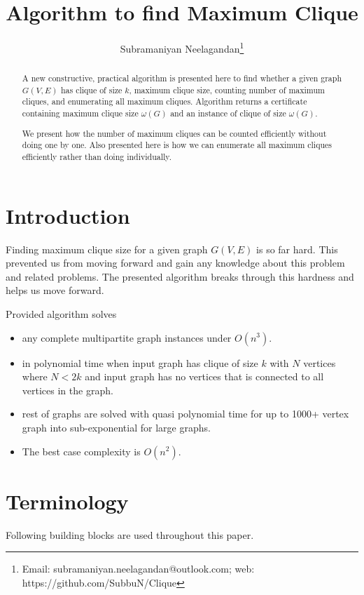 \documentclass[12pt]{article}
\theoremstyle{plain}
\theoremstyle{definition}
\begin{document}
	\title{Algorithm to find Maximum Clique}
	\author[1]{Subramaniyan Neelagandan\footnote{Email: subramaniyan.neelagandan@outlook.com; web: https://github.com/SubbuN/Clique}}
	
	\date{}
	\maketitle

\begin{abstract}
	A new constructive, practical algorithm is presented here to find whether a given graph $G(V,E)$ has clique of size $k$, maximum clique size, counting number of maximum cliques, and enumerating all maximum cliques. Algorithm returns a certificate containing maximum clique size $\omega(G)$ and an instance of clique of size $\omega(G)$.
	
	We present how the number of maximum cliques can be counted efficiently without doing one by one. Also presented here is how we can enumerate all maximum cliques efficiently rather than doing individually.
\end{abstract}


\section{Introduction}
Finding maximum clique size for a given graph $G(V,E)$ is so far hard. This prevented us from moving forward and gain any knowledge about this problem and related problems. The presented algorithm breaks through this hardness and helps us move forward.

Provided algorithm solves 
\begin{itemize}
	\setlength{\itemsep}{0pt}
	\setlength{\parskip}{0pt}
	\setlength{\parsep}{0pt}
	\item any complete multipartite graph instances under $O(n^3)$.
	\item in polynomial time when input graph has clique of size $k$ with $N$ vertices where $N < 2k$ and input graph has no vertices that is connected to all vertices in the graph.
	\item rest of graphs are solved with quasi polynomial time for up to 1000+ vertex graph into sub-exponential for large graphs.
	\item The best case complexity is $O(n^2)$.
\end{itemize}


\section{Terminology}
Following building blocks are used throughout this paper.
\end{document}
